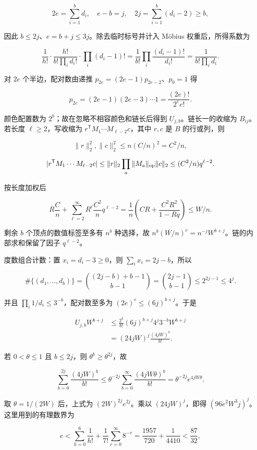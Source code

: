 \documentclass[11pt,a4paper]{article}
\begin{document}
\[2e=\sum_{i=1}^bd_i,\quad e-b=j,\quad
2j=\sum_{i=1}^b(d_i-2)\ge b,\]

因此 \(b\le2j\)、\(e=b+j\le3j\)。除去临时标号并计入 Möbius 权重后，所得系数为

\[\frac1{h!}\cdot\frac{h!}{b!\prod_i d_i!}\cdot\prod_i(d_i-1)!
=\frac1{b!}\prod_i\frac{(d_i-1)!}{d_i!}
=\frac1{b!\prod_i d_i}.\]

对 \(2e\) 个半边，配对数由递推 \(p_{2e}=(2e-1)p_{2e-2}\)、\(p_0=1\) 得

\[p_{2e}=(2e-1)(2e-3)\cdots1=\frac{(2e)!}{2^ee!}.\]

颜色配置数为 \(2^b\)；故在忽略不相容颜色和链长后得到 \(U_{j,b}\)。链长一的收缩为 \(B_{ij}\)。若长度 \(\ell\ge2\)，写收缩为 \(r^{\mathsf T}M_1\cdots M_{\ell-2}c\)，其中 \(r,c\) 是 \(B\) 的行或列，则

\[\|r\|_2^2,\|c\|_2^2\le n(C/n)^2=C^2/n,\]

\[|r^{\mathsf T}M_1\cdots M_{\ell-2}c|
\le\|r\|_2\prod_a\|M_a\|_{\rm op}\|c\|_2
\le(C^2/n)q^{\ell-2}.\]

按长度加权后

\[R\frac Cn+\sum_{\ell=2}^{\infty}R^\ell\frac{C^2}nq^{\ell-2}
=\frac1n\left(CR+\frac{C^2R^2}{1-Rq}\right)\le W/n.\]

剩余 \(b\) 个顶点的数值标签至多有 \(n^b\) 种选择，故 \(n^b(W/n)^e=n^{-j}W^{b+j}\)。链的内部求和保留了因子 \(q^{\ell-2}\)。

度数组合计数：置 \(x_i=d_i-3\ge0\)，则 \(\sum_ix_i=2j-b\)，所以

\[\#\{(d_1,\ldots,d_b)\}=\binom{(2j-b)+b-1}{b-1}
=\binom{2j-1}{b-1}\le2^{2j-1}\le4^j.\]

并且 \(\prod_i1/d_i\le3^{-b}\)，配对数至多为 \((2e)^e\le(6j)^{b+j}\)。于是

\[\begin{aligned}
U_{j,b}W^{b+j}
&\le\frac{2^b}{b!}(6j)^{b+j}4^j3^{-b}W^{b+j}\\
&=(24jW)^j\frac{(4jW)^b}{b!}.
\end{aligned}\]

若 \(0<\theta\le1\) 且 \(b\le2j\)，则 \(\theta^b\ge\theta^{2j}\)，故

\[\sum_{b=0}^{2j}\frac{(4jW)^b}{b!}
\le\theta^{-2j}\sum_{b=0}^{\infty}\frac{(4jW\theta)^b}{b!}
=\theta^{-2j}e^{4jW\theta}.\]

取 \(\theta=1/(2W)\) 后，上式为 \((2W)^{2j}e^{2j}\)。乘以 \((24jW)^j\)，即得 \((96e^2W^3j)^j\)。这里用到的有理数界为

\[e<\sum_{h=0}^6\frac1{h!}+\frac1{7!}\sum_{r=0}^{\infty}8^{-r}
=\frac{1957}{720}+\frac1{4410}<\frac{87}{32},\]
\end{document}

